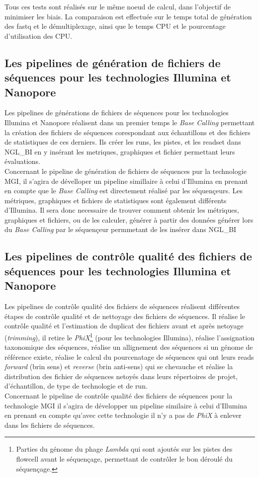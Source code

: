 Tous ces tests sont réalisés sur le même noeud de calcul, dans l'objectif de minimiser les biais. La comparaison est effectuée sur le temps total de génération des fastq et le démultiplexage, ainsi que le temps CPU et le pourcentage d'utilisation des CPU.

\subsection{Les pipelines de génération de fichiers de séquences pour les technologies Illumina et Nanopore}
Les pipelines de générations de fichiers de séquences pour les technologies Illumina et Nanopore réalisent dans un premier temps le \emph{Base Calling} permettant la création des fichiers de séquences corespondant aux échantillons et des fichiers de statistiques de ces derniers. Ils créer les runs, les pistes, et les readset dans NGL\_BI en y insérant les metriques, graphiques et fichier permettant leurs évaluations.\\

Concernant le pipeline de génération de fichiers de séquences pur la technologie MGI, il s'agira de dévelloper un pipeline simillaire à celui d'Illumina en prenant en compte que le \emph{Base Calling} est directement réalisé par les séquençeurs. Les métriques, graphiques et fichiers de statistiques sont également différents d'Illumina. Il sera donc necessaire de trouver comment obtenir les métriques, graphiques et fichiers, ou de les calculer, générer à partir des données générer lors du \emph{Base Calling} par le séquençeur permmetant de les insérer dans NGL\_BI

\newpage
\subsection{Les pipelines de contrôle qualité des fichiers de séquences pour les technologies Illumina et Nanopore}
Les pipelines de contrôle qualité des fichiers de séquences réalisent différentes étapes de contrôle qualité et de nettoyage des fichiers de séquences. Il réalise le contrôle qualité et l'estimation de duplicat des fichiers avant et après netoyage (\emph{trimming}), il retire le \emph{PhiX}\footnote{Parties du génome du phage \emph{Lambda} qui sont ajoutés sur les pistes des flowcell avant le séquençage, permettant de contrôler le bon déroulé du séquençage.} (pour les technologies Illumina), réalise l'assignation taxonomique des séquences, réalise un allignement des séquences si un génome de référence existe, réalise le calcul du pourcenatage de séquences qui ont leurs reads \emph{forward} (brin sens) et \emph{reverse} (brin anti-sens) qui se chevauche et réalise la distribution des fichier de séquences netoyés dans leurs répertoires de projet, d'échantillon, de type de technologie et de run.\\

Concernant le pipeline de contrôle qualité des fichiers de séquences pour la technologie MGI il s'agira de développer un pipeline similaire à celui d'Illumina en prenant en compte qu'avec cette technologie il n'y a pas de \emph{PhiX} à enlever dans les fichiers de séquences.